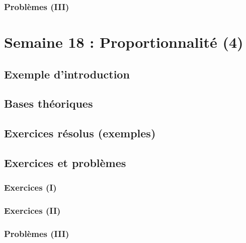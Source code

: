 \documentclass[
  12pt,
]{book}
\begin{document}
\hypertarget{probluxe8mes-iii-16}{%
\subsection{Problèmes (III)}\label{probluxe8mes-iii-16}}

\hypertarget{semaine-18-proportionnalituxe9-4}{%
\chapter{Semaine 18 : Proportionnalité (4)}\label{semaine-18-proportionnalituxe9-4}}

\hypertarget{exemple-dintroduction-17}{%
\section{Exemple d'introduction}\label{exemple-dintroduction-17}}

\hypertarget{bases-thuxe9oriques-17}{%
\section{Bases théoriques}\label{bases-thuxe9oriques-17}}

\hypertarget{exercices-ruxe9solus-exemples-17}{%
\section{Exercices résolus (exemples)}\label{exercices-ruxe9solus-exemples-17}}

\hypertarget{exercices-et-probluxe8mes-17}{%
\section{Exercices et problèmes}\label{exercices-et-probluxe8mes-17}}

\hypertarget{exercices-i-17}{%
\subsection{Exercices (I)}\label{exercices-i-17}}

\hypertarget{exercices-ii-17}{%
\subsection{Exercices (II)}\label{exercices-ii-17}}

\hypertarget{probluxe8mes-iii-17}{%
\subsection{Problèmes (III)}\label{probluxe8mes-iii-17}}
\end{document}
